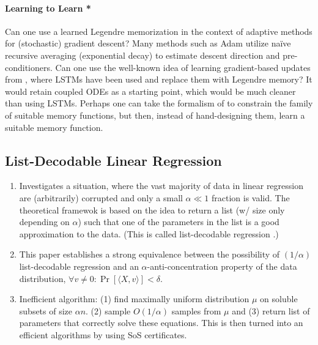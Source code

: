 \documentclass[12pt,a4paper]{article}
\begin{document}
\paragraph{Learning to Learn *} Can one use a learned Legendre memorization in the context of adaptive methods for (stochastic) gradient descent? Many methods such as Adam utilize na\"ive recursive averaging (exponential decay) to estimate descent direction and pre-conditioners. Can one use the well-known idea of learning gradient-based updates from \cite{andrychowicz2016learning}, where LSTMs have been used and replace them with Legendre memory? It would retain coupled ODEs as a starting point, which would be much cleaner than using LSTMs. Perhaps one can take the formalism of \cite{orvieto2019role} to constrain the family of suitable memory functions, but then, instead of hand-designing them, learn a suitable memory function. 


\subsection{List-Decodable Linear Regression \cite{karmalkar2019list}}
\begin{enumerate}
\item Investigates a situation, where the vast majority of data in linear regression are (arbitrarily) corrupted and only a small $\alpha \ll 1$ fraction is valid. The theoretical framewok is based on the idea to return a list (w/ size only depending on $\alpha$) such that one of the parameters in the list is a good approximation to the data. (This is called list-decodable regression \cite{balcan2008discriminative}.)
\item This paper establishes a strong equivalence between the possibility of $(1/\alpha)$ list-decodable regression and an $\alpha$-anti-concentration property of the data distribution, $\forall v \neq 0: \Pr[\langle X, v \rangle] < \delta$.
\item Inefficient algorithm: (1) find maximally uniform distribution $\mu$ on soluble subsets of size $\alpha n$. (2) sample $O(1/\alpha)$ samples from $\mu$ and (3) return list of parameters that correctly solve these equations.  This is then turned into an efficient algorithms by using SoS certificates. 
\end{enumerate}
\end{document}
